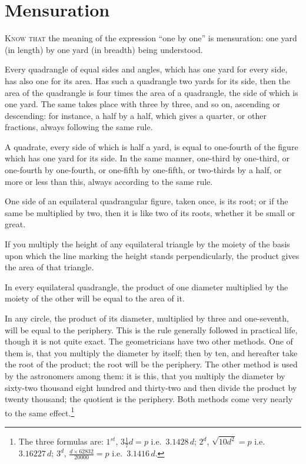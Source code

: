 \clearpage

\section*{Mensuration}

\lettrine{K}{now that} the meaning of the expression ``one by one'' is mensuration: one yard (in length) by one yard (in breadth) being understood.

Every quadrangle of equal sides and angles, which has one yard for every side, has also one for its area. Has such a quadrangle two yards for its side, then the area of the quadrangle is four times the area of a quadrangle, the side of which is one yard. The same takes place with three by three, and so on, ascending or descending: for instance, a half by a half, which gives a quarter, or other fractions, always following the same rule.

A quadrate, every side of which is half a yard, is equal to one-fourth of the figure which has one yard for its side. In the same manner, one-third by one-third, or one-fourth by one-fourth, or one-fifth by one-fifth, or two-thirds by a half, or more or less than this, always according to the same rule.

One side of an equilateral quadrangular figure, taken once, is its root; or if the same be multiplied by two, then it is like two of its roots, whether it be small or great.

If you multiply the height of any equilateral triangle by the moiety of the basis upon which the line marking the height stands perpendicularly, the product gives the area of that triangle.

In every equilateral quadrangle, the product of one diameter multiplied by the moiety of the other will be equal to the area of it.

In any circle, the product of its diameter, multiplied by three and one-seventh, will be equal to the periphery. This is the rule generally followed in practical life, though it is not quite exact. The geometricians have two other methods. One of them is, that you multiply the diameter by itself; then by ten, and hereafter take the root of the product; the root will be the periphery. The other method is used by the astronomers among them: it is this, that you multiply the diameter by sixty-two thousand eight hundred and thirty-two and then divide the product by twenty thousand; the quotient is the periphery. Both methods come very nearly to the same effect.\footnote{The three formulas are: $1^{st}$, $3\frac{1}{7}d = p$ i.e.~$3.1428\,d$; $2^{d}$, $\sqrt{10d^2} = p$ i.e.~$3.16227\,d$; $3^{d}$, $\frac{d \times 62832}{20000} = p$ i.e.~$3.1416\,d$.}

